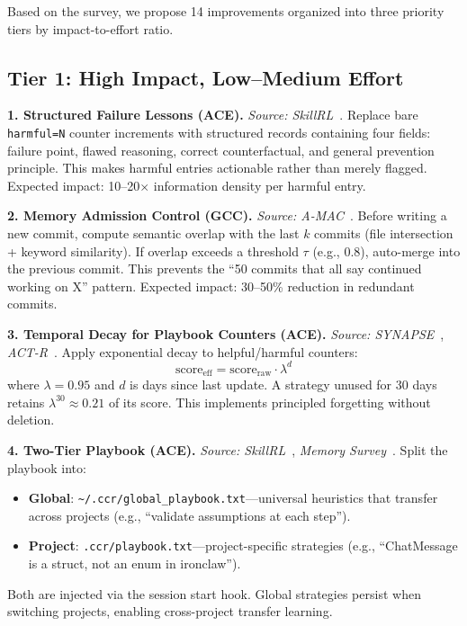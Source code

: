 \documentclass[11pt]{article}
\begin{document}
Based on the survey, we propose 14 improvements organized into three priority tiers by impact-to-effort ratio.

\subsection{Tier 1: High Impact, Low--Medium Effort}

\textbf{1. Structured Failure Lessons (ACE).} \textit{Source: SkillRL}~\cite{skillrl}. Replace bare \texttt{harmful=N} counter increments with structured records containing four fields: failure point, flawed reasoning, correct counterfactual, and general prevention principle. This makes harmful entries actionable rather than merely flagged. Expected impact: 10--20$\times$ information density per harmful entry.

\textbf{2. Memory Admission Control (GCC).} \textit{Source: A-MAC}~\cite{amac}. Before writing a new commit, compute semantic overlap with the last $k$ commits (file intersection + keyword similarity). If overlap exceeds a threshold $\tau$ (e.g., 0.8), auto-merge into the previous commit. This prevents the ``50 commits that all say continued working on X'' pattern. Expected impact: 30--50\% reduction in redundant commits.

\textbf{3. Temporal Decay for Playbook Counters (ACE).} \textit{Source: SYNAPSE}~\cite{synapse}, \textit{ACT-R}~\cite{actr}. Apply exponential decay to helpful/harmful counters:
\begin{equation}
    \text{score}_{\text{eff}} = \text{score}_{\text{raw}} \cdot \lambda^{d}
\end{equation}
where $\lambda = 0.95$ and $d$ is days since last update. A strategy unused for 30 days retains $\lambda^{30} \approx 0.21$ of its score. This implements principled forgetting without deletion.

\textbf{4. Two-Tier Playbook (ACE).} \textit{Source: SkillRL}~\cite{skillrl}, \textit{Memory Survey}~\cite{memory_survey}. Split the playbook into:
\begin{itemize}[leftmargin=*]
    \item \textbf{Global}: \texttt{\textasciitilde/.ccr/global\_playbook.txt}---universal heuristics that transfer across projects (e.g., ``validate assumptions at each step'').
    \item \textbf{Project}: \texttt{.ccr/playbook.txt}---project-specific strategies (e.g., ``ChatMessage is a struct, not an enum in ironclaw'').
\end{itemize}
Both are injected via the session start hook. Global strategies persist when switching projects, enabling cross-project transfer learning.
\end{document}
